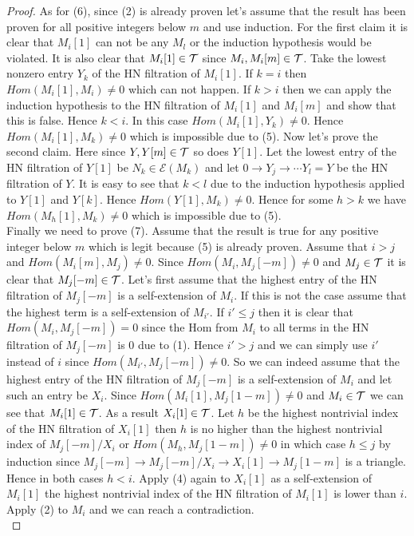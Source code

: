 \begin{proof}
\indent As for (6), since (2) is already proven let's assume that the result has been proven for all positive integers below $m$ and use induction. For the first claim it is clear that $M_i[1]$ can not be any $M_l$ or the induction hypothesis would be violated. It is also clear that $M_i[1]\in\mathcal{T}$ since $M_i, M_i[m]\in\mathcal{T}$. Take the lowest nonzero entry $Y_k$ of the HN filtration of $M_i[1]$. If $k=i$ then $Hom(M_i[1],M_i)\neq 0$ which can not happen. If $k>i$ then we can apply the induction hypothesis to the HN filtration of $M_i[1]$ and $M_i[m]$ and show that this is false. Hence $k<i$. In this case $Hom(M_i[1],Y_k)\neq 0$. Hence $Hom(M_i[1],M_k)\neq 0$ which is impossible due to (5). Now let's prove the second claim. Here since $Y,Y[m]\in\mathcal{T}$ so does $Y[1]$. Let the lowest entry of the HN filtration of $Y[1]$ be $N_k\in\mathcal{E}(M_k)$ and let $0\to Y_j\to\cdots Y_l = Y$ be the HN filtration of $Y$. It is easy to see that $k<l$ due to the induction hypothesis applied to $Y[1]$ and $Y[k]$. Hence $Hom(Y[1],M_k)\neq 0$. Hence for some $h>k$ we have $Hom(M_h[1],M_k)\neq 0$ which is impossible due to (5).\\
\indent Finally we need to prove (7). Assume that the result is true for any positive integer below $m$ which is legit because (5) is already proven. Assume that $i>j$ and $Hom(M_i[m],M_j) \neq 0$. Since $Hom(M_i, M_j[-m])\neq 0$ and $M_j\in\mathcal{T}$ it is clear that $M_j[-m]\in\mathcal{T}$. Let's first assume that the highest entry of the HN filtration of $M_j[-m]$ is a self-extension of $M_i$. If this is not the case assume that the highest term is a self-extension of $M_{i'}$. If $i'\leq j$ then it is clear that $Hom(M_i,M_j[-m])=0$ since the Hom from $M_i$ to all terms in the HN filtration of $M_j[-m]$ is 0 due to (1). Hence $i'>j$ and we can simply use $i'$ instead of $i$ since $Hom(M_{i'},M_j[-m])\neq 0$. So we can indeed assume that the highest entry of the HN filtration of $M_j[-m]$ is a self-extension of $M_i$ and let such an entry be $X_i$. Since $Hom(M_i[1], M_j[1-m])\neq 0$ and $M_i\in\mathcal{T}$ we can see that $M_i[1]\in\mathcal{T}$. As a result $X_i[1]\in\mathcal{T}$. Let $h$ be the highest nontrivial index of the HN filtration of $X_i[1]$ then $h$ is no higher than the highest nontrivial index of $M_j[-m]/X_i$ or $Hom(M_h,M_j[1-m])\neq 0$ in which case $h\leq j$ by induction since $M_j[-m]\to M_j[-m]/X_i\to X_i[1]\to M_j[1-m]$ is a triangle. Hence in both cases $h<i$. Apply (4) again to $X_i[1]$ as a self-extension of $M_i[1]$ the highest nontrivial index of the HN filtration of $M_i[1]$ is lower than $i$. Apply (2) to $M_i$ and we can reach a contradiction.\\
\end{proof}
